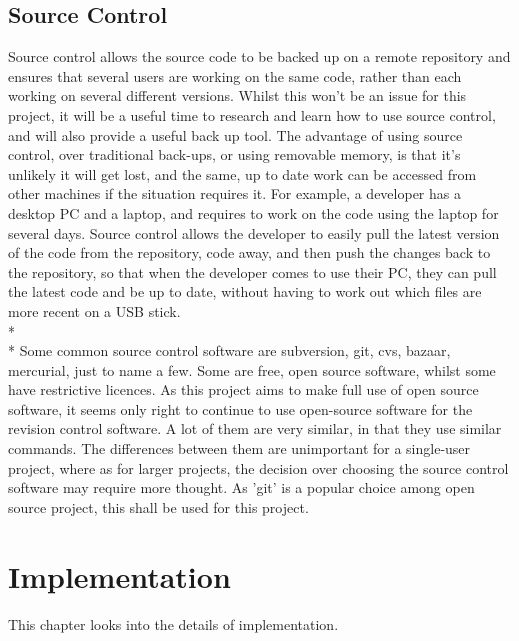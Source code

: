 \documentclass[12pt]{report}
\begin{document}
\section{Source Control}\label{sec:dev_source_control}
Source control allows the source code to be backed up on a remote repository and ensures that several users are working on the same code, rather than each working on several different versions.  Whilst this won't be an issue for this project, it will be a useful time to research and learn how to use source control, and will also provide a useful back up tool.  The advantage of using source control, over traditional back-ups, or using removable memory, is that it's unlikely it will get lost, and the same, up to date work can be accessed from other machines if the situation requires it.  For example, a developer has a desktop PC and a laptop, and requires to work on the code using the laptop for several days.  Source control allows the developer to easily pull the latest version of the code from the repository, code away, and then push the changes back to the repository, so that when the developer comes to use their PC, they can pull the latest code and be up to date, without having to work out which files are more recent on a USB stick.
\\*
\\*
Some common source control software are subversion, git, cvs, bazaar, mercurial, just to name a few.  Some are free, open source software, whilst some have restrictive licences.  As this project aims to make full use of open source software, it seems only right to continue to use open-source software for the revision control software.  A lot of them are very similar, in that they use similar commands.  The differences between them are unimportant for a single-user project, where as for larger projects, the decision over choosing the source control software may require more thought.  As 'git' is a popular choice among open source project, this shall be used for this project.

\chapter{Implementation}
This chapter looks into the details of implementation.
\end{document}

